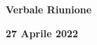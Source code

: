 \begin{center}
  \Huge\textbf{Verbale Riunione}
\end{center}

\begin{center}
  \LARGE\textbf{27 Aprile 2022}
\end{center}

\bigskip
\bigskip
\bigskip
